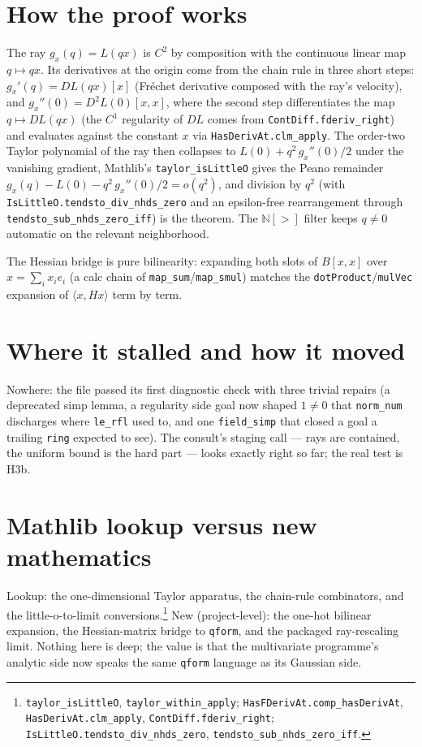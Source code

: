 \documentclass[11pt]{article}
\begin{document}
\section{How the proof works}

The ray $g_x(q) = L(qx)$ is $C^2$ by composition with the continuous
linear map $q \mapsto qx$. Its derivatives at the origin come from
the chain rule in three short steps: $g_x'(q) = DL(qx)[x]$ (Fr\'echet
derivative composed with the ray's velocity), and
$g_x''(0) = D^2L(0)[x,x]$, where the second step differentiates the
map $q \mapsto DL(qx)$ (the $C^1$ regularity of $DL$ comes from
\texttt{ContDiff.fderiv\_right}) and evaluates against the constant
$x$ via \texttt{HasDerivAt.clm\_apply}. The order-two Taylor
polynomial of the ray then collapses to
$L(0) + q^2\,g_x''(0)/2$ under the vanishing gradient, Mathlib's
\texttt{taylor\_isLittleO} gives the Peano remainder
$g_x(q) - L(0) - q^2\,g_x''(0)/2 = o(q^2)$, and division by $q^2$
(with \texttt{IsLittleO.tendsto\_div\_nhds\_zero} and an
epsilon-free rearrangement through
\texttt{tendsto\_sub\_nhds\_zero\_iff}) is the theorem. The
$\mathbb{N}[>]$ filter keeps $q \neq 0$ automatic on the relevant
neighborhood.

The Hessian bridge is pure bilinearity: expanding both slots of
$B[x,x]$ over $x = \sum_i x_i e_i$ (a calc chain of
\texttt{map\_sum}/\texttt{map\_smul}) matches the
\texttt{dotProduct}/\texttt{mulVec} expansion of
$\langle x, Hx\rangle$ term by term.

\section{Where it stalled and how it moved}

Nowhere: the file passed its first diagnostic check with three
trivial repairs (a deprecated simp lemma, a regularity side goal now
shaped $1 \neq 0$ that \texttt{norm\_num} discharges where
\texttt{le\_rfl} used to, and one \texttt{field\_simp} that closed a
goal a trailing \texttt{ring} expected to see). The consult's
staging call --- rays are contained, the uniform bound is the hard
part --- looks exactly right so far; the real test is H3b.

\section{Mathlib lookup versus new mathematics}

Lookup: the one-dimensional Taylor apparatus, the chain-rule
combinators, and the little-o-to-limit
conversions.\footnote{\texttt{taylor\_isLittleO},
\texttt{taylor\_within\_apply};
\texttt{HasFDerivAt.comp\_hasDerivAt},
\texttt{HasDerivAt.clm\_apply}, \texttt{ContDiff.fderiv\_right};
\texttt{IsLittleO.tendsto\_div\_nhds\_zero},
\texttt{tendsto\_sub\_nhds\_zero\_iff}.} New (project-level): the
one-hot bilinear expansion, the Hessian-matrix bridge to
\texttt{qform}, and the packaged ray-rescaling limit. Nothing here
is deep; the value is that the multivariate programme's analytic
side now speaks the same \texttt{qform} language as its Gaussian
side.
\end{document}
